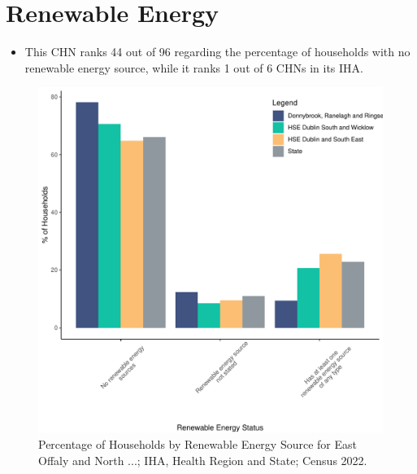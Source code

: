 \documentclass{article}
\begin{document}
\section{Renewable Energy}\label{sect:RE}
\begin{itemize}
\item This CHN ranks  44 out of 96 regarding the percentage of households with no renewable energy source, while it ranks   1 out of 6 CHNs in its IHA.
\end{itemize}
\begin{figure}[H]
	\centering
	\includegraphics[width = 140mm]{../figures/RenewableEnergyED.pdf}
	\caption{Percentage of Households by Renewable Energy Source for East Offaly and North ...; IHA, Health Region and State; Census 2022.}
	\label{fig:vbnv}
	\end{figure}
\end{document}
